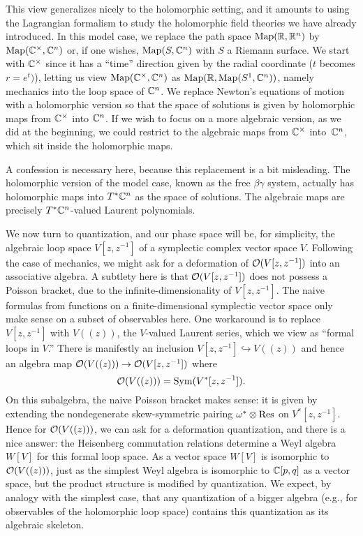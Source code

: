 \documentclass[11pt]{amsart}
\begin{document}
This view generalizes nicely to the holomorphic setting,
and it amounts to using the Lagrangian formalism to study the holomorphic field theories we have already introduced.
In this model case, we replace the path space ${\rm Map}(\mathbb R, \mathbb R^n)$ by ${\rm Map}(\mathbb C^\times, \mathbb C^n)$ or, if one wishes, ${\rm Map}(S, \mathbb C^n)$ with $S$ a Riemann surface.
We start with $\mathbb C^\times$ since it has a ``time'' direction given by the radial coordinate ($t$ becomes $r = e^t)$),
letting us view ${\rm Map}(\mathbb C^\times, \mathbb C^n)$ as  ${\rm Map}(\mathbb R, {\rm Map}(S^1,\mathbb C^n))$, namely mechanics into the loop space of $\mathbb C^n$.
We replace Newton's equations of motion with a holomorphic version
so that the space of solutions is given by holomorphic maps from $\mathbb C^\times$ into $\mathbb C^n$.
If we wish to focus on a more algebraic version, as we did at the beginning,
we could restrict to the algebraic maps from $\mathbb C^\times$ into~$\mathbb C^n$,
which sit inside the holomorphic maps.

A confession is necessary here, because this replacement is a bit misleading.
The holomorphic version of the model case, known as the free $\beta\gamma$ system,
actually has holomorphic maps into $T^* \mathbb C^n$ as the space of solutions.
The algebraic maps are precisely $T^* \mathbb C^n$-valued Laurent polynomials.

We now turn to quantization, and our phase space will be, for simplicity, the algebraic loop space $V[z,z^{-1}]$ of a symplectic complex vector space $V$.
Following the case of mechanics, we might ask for a deformation of $\mathcal O(V[z,z^{-1}])$ into an associative algebra.
A subtlety here is that $\mathcal O(V[z,z^{-1}])$ does not possess a Poisson bracket, 
due to the  infinite-dimensionality of $V[z,z^{-1}]$.
The naive formulas from functions on a finite-dimensional symplectic vector space only make sense on a subset of observables here.
One workaround is to replace $V[z,z^{-1}]$ with $V((z))$, the $V$-valued Laurent series,
which we view as ``formal loops in $V$.''
There is manifestly an inclusion $V[z,z^{-1}] \hookrightarrow V((z))$ and hence an algebra map $\mathcal O(V((z))) \to \mathcal O(V[z,z^{-1}])$
where 
\[
\mathcal O(V((z))) = \operatorname{Sym}(V^* [z,z^{-1}]).
\]
On this subalgebra, the naive Poisson bracket makes sense: it is given by extending the nondegenerate skew-symmetric pairing $\omega^* \otimes {\rm Res}$ on $V^* [z,z^{-1}]$.
Hence for $\mathcal O(V((z)))$, we can ask for a deformation quantization,
and there is a nice answer: 
the Heisenberg commutation relations determine a Weyl algebra $W[V]$ for this formal loop space.
As a vector space $W[V]$ is isomorphic to $\mathcal O(V((z)))$, 
just as the simplest Weyl algebra is isomorphic to $\mathbb C[p,q]$ as a vector space,
but the product structure is modified by quantization.
We expect, by analogy with the simplest case, that any quantization of a bigger algebra (e.g., for observables of the holomorphic loop space) contains this quantization as its algebraic skeleton.
\end{document}
